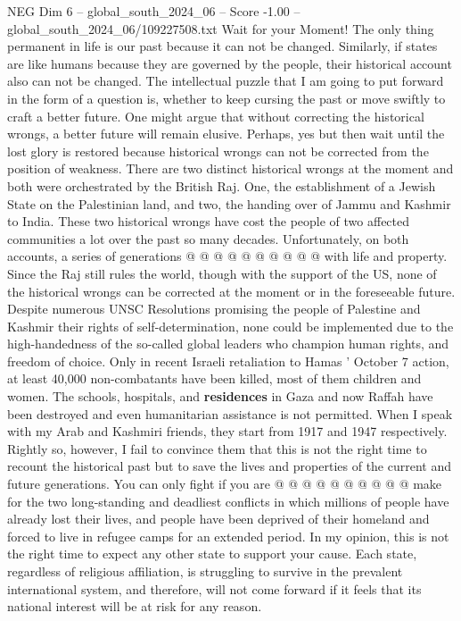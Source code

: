 \begin{textsample}{NEG Dim 6 – global\_south\_2024\_06 – Score -1.00 – global\_south\_2024\_06/109227508.txt}  \label{ex:f6_neg_297}
Wait for your Moment!
The only thing permanent in life is our past because it can not be changed.
Similarly, if states are like humans because they are governed by the people, their historical account also can not be changed.
The intellectual puzzle that I am going to put forward in the form of a question is, whether to keep cursing the past or move swiftly to craft a better future.
One might argue that without correcting the historical wrongs, a better future will remain elusive.
Perhaps, yes but then wait until the lost glory is restored because historical wrongs can not be corrected from the position of weakness.
There are two distinct historical wrongs at the moment and both were orchestrated by the British Raj.
One, the establishment of a Jewish State on the Palestinian land, and two, the handing over of Jammu and Kashmir to India.
These two historical wrongs have cost the people of two affected communities a lot over the past so many decades.
Unfortunately, on both accounts, a series of generations @ @ @ @ @ @ @ @ @ @ with life and property.
Since the Raj still rules the world, though with the support of the US, none of the historical wrongs can be corrected at the moment or in the foreseeable future.
Despite numerous UNSC Resolutions promising the people of Palestine and Kashmir their rights of self-determination, none could be implemented due to the high-handedness of the so-called global leaders who champion human rights, and freedom of choice.
Only in recent Israeli retaliation to Hamas ' October 7 action, at least 40,000 non-combatants have been killed, most of them children and women.
The schools, hospitals, and \textbf{residences} in Gaza and now Raffah have been destroyed and even humanitarian assistance is not permitted.
When I speak with my Arab and Kashmiri friends, they start from 1917 and 1947 respectively.
Rightly so, however, I fail to convince them that this is not the right time to recount the historical past but to save the lives and properties of the current and future generations.
You can only fight if you are @ @ @ @ @ @ @ @ @ @ make for the two long-standing and deadliest conflicts in which millions of people have already lost their lives, and people have been deprived of their homeland and forced to live in refugee camps for an extended period.
In my opinion, this is not the right time to expect any other state to support your cause.
Each state, regardless of religious affiliation, is struggling to survive in the prevalent international system, and therefore, will not come forward if it feels that its national interest will be at risk for any reason.

\end{textsample}
